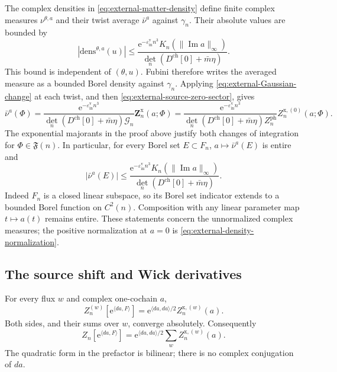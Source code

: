 The complex densities in
\eqref{eq:external-matter-density} define finite complex
measures $\nu^{\theta,a}$ and their twist average
$\bar\nu^a$ against $\gamma_n$. Their absolute values
are bounded by
\begin{equation}\label{eq:external-complex-density-bound}
 |\mathrm{dens}^{\theta,a}(u)|
 \le
 \frac{\mathrm e^{-\varepsilon_{\mathrm{in}}^{\mathrm v}n^3}
                   K_n(\|\operatorname{Im}a\|_\infty)}
                   {\det_n(D^{\mathrm{ch}}[0]+\bar m\eta)}.
\end{equation}
This bound is independent of $(\theta,u)$.
Fubini therefore writes the averaged measure as a
bounded Borel density against $\gamma_n$. Applying
\eqref{eq:external-Gaussian-change} at each twist,
and then \eqref{eq:external-source-zero-sector}, gives
\begin{equation}\label{eq:external-complex-measure}
 \bar\nu^a(\Phi)=
 \frac{\mathrm e^{-\varepsilon_{\mathrm{in}}^{\mathrm v}n^3}}
      {\det_n(D^{\mathrm{ch}}[0]+\bar m\eta)\mathcal G_n}
                     \mathbf Z_n^{\mathrm{x}}(a;\Phi)
 =
 \frac{\mathrm e^{-\varepsilon_{\mathrm{in}}^{\mathrm v}n^3}}
      {\det_n(D^{\mathrm{ch}}[0]+\bar m\eta)Z_n^{\mathrm{ph}}}
                     Z_n^{\mathrm{x},(0)}(a;\Phi).
\end{equation}
The exponential majorants in the proof above justify
both changes of integration for $\Phi\in\mathfrak F(n)$.
In particular, for every Borel set $E\subset F_n$,
$a\mapsto\bar\nu^a(E)$ is entire and
\[
 |\bar\nu^a(E)|\le
 \frac{\mathrm e^{-\varepsilon_{\mathrm{in}}^{\mathrm v}n^3}
                   K_n(\|\operatorname{Im}a\|_\infty)}
                   {\det_n(D^{\mathrm{ch}}[0]+\bar m\eta)}.
\]
Indeed $F_n$ is a closed linear subspace, so its
Borel set indicator extends to a bounded Borel
function on $C^2(n)$. Composition with any linear
parameter map $t\mapsto a(t)$ remains entire.
These statements concern the unnormalized complex
measures; the positive normalization at $a=0$ is
\eqref{eq:external-density-normalization}.

\subsection{The source shift and Wick derivatives}
\label{subsec:external-source-shift}

\begin{proposition}\label{prop:external-shift}
For every flux $w$ and complex one-cochain $a$,
\begin{equation}\label{eq:external-shift-sector}
 Z_n^{(w)}[\mathrm e^{\langle da,F\rangle}]
      =\mathrm e^{\langle da,da\rangle/2}Z_n^{\mathrm{x},(w)}(a).
\end{equation}
Both sides, and their sums over $w$, converge
absolutely. Consequently
\begin{equation}\label{eq:external-shift-all-flux}
 Z_n[\mathrm e^{\langle da,F\rangle}]
      =\mathrm e^{\langle da,da\rangle/2}
                    \sum_w Z_n^{\mathrm{x},(w)}(a).
\end{equation}
The quadratic form in the prefactor is bilinear;
there is no complex conjugation of $da$.
\end{proposition}

